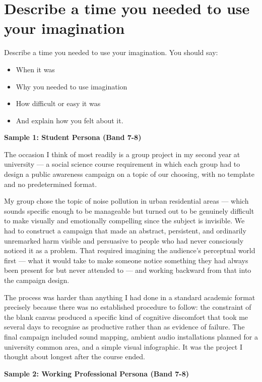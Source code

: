 \section{Describe a time you needed to use your imagination}
\begin{ieltsprompt}
Describe a time you needed to use your imagination.
You should say:
\begin{itemize}[leftmargin=2em, itemsep=2pt]
\item When it was
\item Why you needed to use imagination
\item How difficult or easy it was
\item And explain how you felt about it.
\end{itemize}
\end{ieltsprompt}
\begin{ieltsanswer}
\textbf{Sample 1: Student Persona (Band 7-8)}

The occasion I think of most readily is a group project in my second year at university — a social science course requirement in which each group had to design a public awareness campaign on a topic of our choosing, with no template and no predetermined format.

My group chose the topic of noise pollution in urban residential areas — which sounds specific enough to be manageable but turned out to be genuinely difficult to make visually and emotionally compelling since the subject is invisible. We had to construct a campaign that made an abstract, persistent, and ordinarily unremarked harm visible and persuasive to people who had never consciously noticed it as a problem. That required imagining the audience's perceptual world first — what it would take to make someone notice something they had always been present for but never attended to — and working backward from that into the campaign design.

The process was harder than anything I had done in a standard academic format precisely because there was no established procedure to follow: the constraint of the blank canvas produced a specific kind of cognitive discomfort that took me several days to recognise as productive rather than as evidence of failure. The final campaign included sound mapping, ambient audio installations planned for a university common area, and a simple visual infographic. It was the project I thought about longest after the course ended.

\textbf{Sample 2: Working Professional Persona (Band 7-8)}


\end{ieltsanswer}

